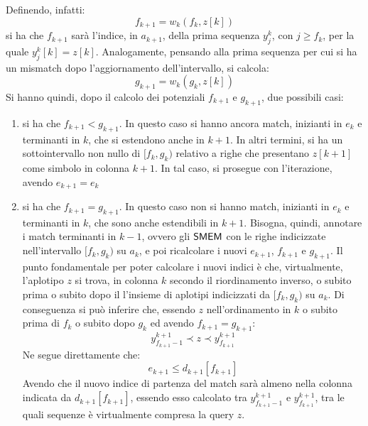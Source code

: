 Definendo, infatti:
\begin{equation}
  \label{eq:pbwtq5}
  f_{k+1}=w_k(f_k,z[k])
\end{equation}
si ha che $f_{k+1}$ sarà l'indice, in $a_{k+1}$, della prima sequenza $y_j^k$,
con $j\geq f_k$, per la quale $y_j^k[k]=z[k]$. Analogamente, pensando alla prima
sequenza per cui si ha un mismatch dopo l'aggiornamento dell'intervallo, si
calcola: 
\begin{equation}
  \label{eq:pbwtq6}
  g_{k+1}=w_k(g_k,z[k])
\end{equation}
Si hanno quindi, dopo il calcolo dei potenziali $f_{k+1}$ e $g_{k+1}$, due
possibili casi: 
\begin{enumerate}
  \item si ha che $f_{k+1}<g_{k+1}$. In questo caso si hanno ancora match,
  inizianti in $e_k$ e terminanti in $k$, che si estendono anche in $k+1$. In
  altri 
  termini, si 
  ha un sottointervallo non nullo di $[f_k, g_k)$ relativo a righe che 
  presentano $z[k+1]$ come simbolo in colonna $k+1$. In tal caso, si
  prosegue con l'iterazione, avendo $e_{k+1}=e_k$
  \item si ha che $f_{k+1}=g_{k+1}$. In questo caso non si hanno match,
  inizianti in $e_k$ e terminanti in $k$, che sono anche estendibili in
  $k+1$. Bisogna, quindi, 
  annotare i match terminanti in $k-1$, ovvero gli $\mbox{\rm {\sf SMEM}}$ con le righe
  indicizzate nell'intervallo
  $[f_k,g_k)$ su $a_k$, 
  e poi ricalcolare i nuovi $e_{k+1}$, $f_{k+1}$ e $g_{k+1}$. Il punto
  fondamentale per poter calcolare i nuovi indici è 
  che, virtualmente, l'aplotipo $z$ si trova, in colonna $k$ secondo il
  riordinamento inverso, o subito prima o
  subito dopo il l'insieme di aplotipi indicizzati da $[f_k,g_k)$ su $a_k$.
  Di conseguenza si può inferire che,
  essendo $z$
  nell'ordinamento in $k$ o subito prima di $f_{k}$ o subito dopo $g_k$ ed
  avendo $f_{k+1}=g_{k+1}$: 
  \begin{equation}
    \label{eq:pbwtsmem1}
    y_{f_{k+1}-1}^{k+1}\prec z\prec y_{f_{k+1}}^{k+1}
  \end{equation}
  Ne segue direttamente che:
  \begin{equation}
    \label{eq:pbwtsmem2}
    e_{k+1}\leq d_{k+1}[f_{k+1}]
  \end{equation}
  Avendo che il nuovo indice di partenza del match sarà almeno nella colonna
  indicata da $d_{k+1}[f_{k+1}]$, essendo esso calcolato tra $
  y_{f_{k+1}-1}^{k+1}$ e $ y_{f_{k+1}}^{k+1}$, tra le quali sequenze è
  virtualmente compresa la query $z$. \\

\end{enumerate}
